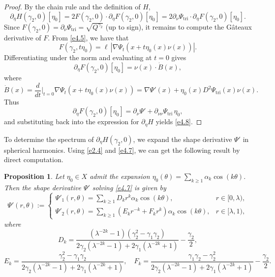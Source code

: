 \documentclass[reqno]{amsart}
\numberwithin{equation}{section}
\newtheorem{proposition}[theorem]{Proposition}
\numberwithin{equation}{section}
\numberwithin{equation}{section}
\begin{document}
\begin{proof}
By the chain rule and the definition of \(H\),
\[
\partial_\eta H(\gamma_2,0)[\eta_0] = 2 F(\gamma_2,0) \cdot \partial_\eta F(\gamma_2,0)[\eta_0] = 2 \partial_\nu \Psi_\mathrm{tri} \cdot \partial_\eta F(\gamma_2,0)[\eta_0].
\]
Since \(F(\gamma_2,0) = \partial_\nu \Psi_\mathrm{tri} = \sqrt{Q^{\gamma_2}}\) (up to sign), it remains to compute the G\^{a}teaux derivative of \(F\). From \eqref{e4.5}, we have that
\[
F(\gamma_2, t\eta_0) = \ell \, |\nabla \Psi_t(x + t\eta_0(x)\nu(x))|.
\]
Differentiating under the norm and evaluating at \(t=0\) gives
\[
\partial_\eta F(\gamma_2,0)[\eta_0] = \nu(x) \cdot \dot{B}(x),
\]
where
\[
\dot{B}(x) = \frac{d}{dt}\Big|_{t=0} \nabla \Psi_t(x + t\eta_0(x)\nu(x)) = \nabla \Psi'(x) + \eta_0(x) D^2 \Psi_\mathrm{tri}(x) \nu(x).
\]
Thus
\[
\partial_\eta F(\gamma_2,0)[\eta_0] = \partial_\nu \Psi' + \partial_{\nu\nu} \Psi_\mathrm{tri} \, \eta_0,
\]
and substituting back into the expression for \(\partial_\eta H\) yields \eqref{e4.8}.
\end{proof}

To determine the spectrum of \(\partial_\eta H(\gamma_2,0)\), we expand the shape derivative \(\Psi'\) in spherical harmonics. Using \eqref{e2.4} and \eqref{e4.7}, we can get the following result by direct computation.

\begin{proposition}\label{pro-4.4}
Let \(\eta_0 \in X\) admit the expansion \(\eta_0(\theta) = \sum_{k \geq 1} \alpha_k \cos(k\theta)\). Then the shape derivative \(\Psi'\) solving \eqref{e4.7} is given by
\begin{equation}
\Psi'(r,\theta) :=
\begin{cases}
\Psi'_1(r,\theta) = \sum_{k \geq 1} D_k r^k \alpha_k \cos(k\theta), & r \in [0,\lambda), \\
\Psi'_2(r,\theta) = \sum_{k \geq 1} (E_k r^{-k} + F_k r^k) \alpha_k \cos(k\theta), & r \in [\lambda,1), \nonumber
\end{cases}
\end{equation}
where
\[
D_k = \frac{(\lambda^{-2k}-1)(\gamma_2^2 - \gamma_1 \gamma_2)}{2\gamma_2(\lambda^{-2k}-1) + 2\gamma_1(\lambda^{-2k}+1)} - \frac{\gamma_2}{2},
\]
\[
E_k = \frac{\gamma_2^2 - \gamma_1 \gamma_2}{2\gamma_2(\lambda^{-2k}-1) + 2\gamma_1(\lambda^{-2k}+1)}, \quad
F_k = \frac{\gamma_1 \gamma_2 - \gamma_2^2}{2\gamma_2(\lambda^{-2k}-1) + 2\gamma_1(\lambda^{-2k}+1)} - \frac{\gamma_2}{2}.
\]
\end{proposition}
\end{document}
